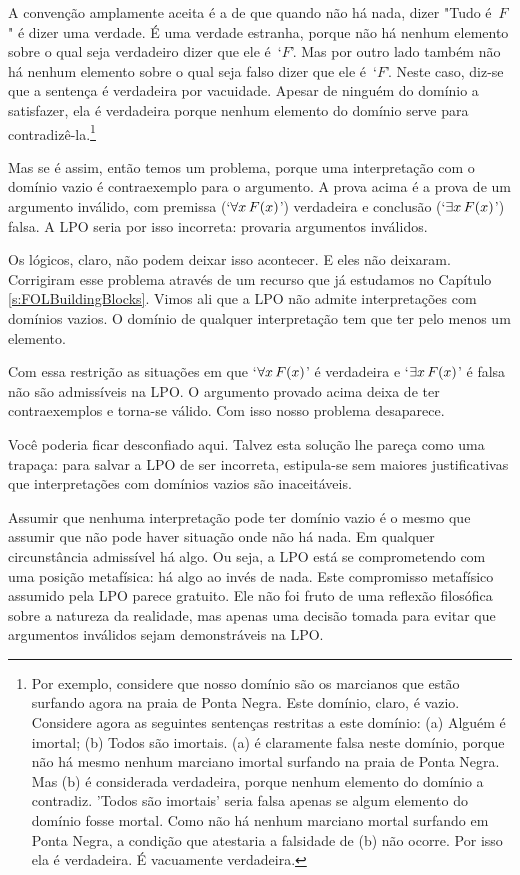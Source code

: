 A convenção amplamente aceita é a de que quando não há nada, dizer "Tudo é~$F$" é dizer uma verdade. É uma verdade estranha, porque não há nenhum elemento sobre o qual seja verdadeiro dizer que ele é~`$F$'. Mas por outro lado também não há nenhum elemento sobre o qual seja falso dizer que ele é~`$F$'. Neste caso, diz-se que a sentença é verdadeira por vacuidade. Apesar de ninguém do domínio a satisfazer, ela é verdadeira porque nenhum elemento do domínio serve para contradizê-la.\footnote{Por exemplo, considere que nosso domínio são os marcianos que estão surfando agora na praia de Ponta Negra. Este domínio, claro, é vazio. Considere agora as seguintes sentenças restritas a este domínio: (a) Alguém é imortal; (b) Todos são imortais. (a) é claramente falsa neste domínio, porque não há mesmo nenhum marciano imortal surfando na praia de Ponta Negra. Mas (b) é considerada verdadeira, porque nenhum elemento do domínio a contradiz. 'Todos são imortais' seria falsa apenas se algum elemento do domínio fosse mortal. Como não há nenhum marciano mortal surfando em Ponta Negra, a condição que atestaria a falsidade de (b) não ocorre. Por isso ela é verdadeira. É vacuamente verdadeira.}


Mas se é assim, então temos um problema, porque uma interpretação com o domínio vazio é contraexemplo para o argumento. A prova acima é a prova de um argumento inválido, com premissa (`$\forall x\,\mathord{F}(x)$') verdadeira e conclusão (`$\exists x\,\mathord{F}(x)$') falsa. A LPO seria por isso incorreta: provaria argumentos inválidos.

Os lógicos, claro, não podem deixar isso acontecer. E eles não deixaram. Corrigiram esse problema através de um recurso que já estudamos no Capítulo \ref{s:FOLBuildingBlocks}. Vimos ali que a LPO não admite interpretações com domínios vazios. O domínio de qualquer interpretação tem que ter pelo menos um elemento.

Com essa restrição as situações em que `$\forall x\,\mathord{F}(x)$' é verdadeira e `$\exists x\,\mathord{F}(x)$' é falsa não são admissíveis na LPO. O argumento provado acima deixa de ter contraexemplos e torna-se válido. Com isso nosso problema desaparece.

Você poderia ficar desconfiado aqui. Talvez esta solução lhe pareça como uma trapaça: para salvar a LPO de ser incorreta, estipula-se sem maiores justificativas que interpretações com domínios vazios são inaceitáveis.

Assumir que nenhuma interpretação pode ter domínio vazio é o mesmo que assumir que não pode haver situação onde não há nada. Em qualquer circunstância admissível há algo.
Ou seja, a LPO está se comprometendo com uma posição metafísica: há algo ao invés de nada. Este compromisso metafísico assumido pela LPO parece gratuito. Ele não foi fruto de uma reflexão filosófica sobre a natureza da realidade, mas apenas uma decisão tomada para evitar que argumentos inválidos sejam demonstráveis na LPO.

